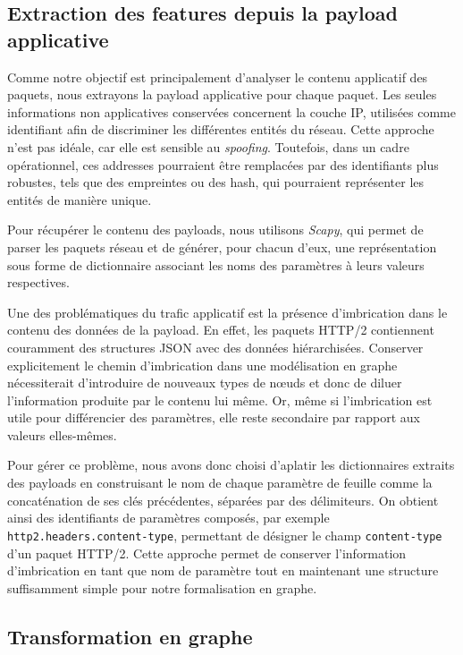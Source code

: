 \documentclass[a4paper,11pt,twoside]{StyleThese}
\begin{document}
\subsection{Extraction des features depuis la payload applicative}
Comme notre objectif est principalement d’analyser le contenu applicatif des paquets, nous extrayons la payload applicative pour chaque paquet. Les seules informations non applicatives conservées concernent la couche IP, utilisées comme identifiant afin de discriminer les différentes entités du réseau. Cette approche n’est pas idéale, car elle est sensible au \textit{spoofing}. Toutefois, dans un cadre opérationnel, ces addresses pourraient être remplacées par des identifiants plus robustes, tels que des empreintes ou des hash, qui pourraient représenter les entités de manière unique.

Pour récupérer le contenu des payloads, nous utilisons \textit{Scapy}, qui permet de parser les paquets réseau et de générer, pour chacun d’eux, une représentation sous forme de dictionnaire associant les noms des paramètres à leurs valeurs respectives.

Une des problématiques du trafic applicatif est la présence d'imbrication dans le contenu des données de la payload. En effet, les paquets HTTP/2 contiennent couramment des structures JSON avec des données hiérarchisées. Conserver explicitement le chemin d’imbrication dans une modélisation en graphe nécessiterait d'introduire de nouveaux types de nœuds et donc de diluer l'information produite par le contenu lui même. Or, même si l’imbrication est utile pour différencier des paramètres, elle reste secondaire par rapport aux valeurs elles-mêmes.

Pour gérer ce problème, nous avons donc choisi d’aplatir les dictionnaires extraits des payloads en construisant le nom de chaque paramètre de feuille comme la concaténation de ses clés précédentes, séparées par des délimiteurs. On obtient ainsi des identifiants de paramètres composés, par exemple \texttt{http2.headers.content-type}, permettant de désigner le champ \texttt{content-type} d’un paquet HTTP/2. Cette approche permet de conserver l’information d’imbrication en tant que nom de paramètre tout en maintenant une structure suffisamment simple pour notre formalisation en graphe.

\subsection{Transformation en graphe}
\end{document}

